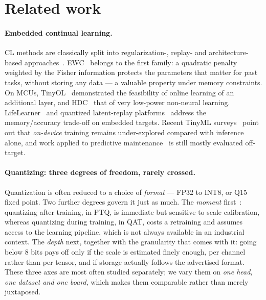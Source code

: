 \section{Related work}
\label{sec:related}

\paragraph{Embedded continual learning.} CL methods are classically split into regularization-, replay-
and architecture-based approaches~\cite{DeLange2021Survey}. EWC~\cite{Kirkpatrick2017EWC} belongs to the
first family: a quadratic penalty weighted by the Fisher information protects the parameters that matter
for past tasks, without storing any data --- a valuable property under memory constraints. On MCUs,
\gls{TinyOL}~\cite{Ren2021TinyOL} demonstrated the feasibility of online learning of an additional layer, and
\gls{HDC}~\cite{Benatti2019HDC} that of very low-power non-neural learning.
LifeLearner~\cite{Kwon2023LifeLearner} and quantized latent-replay
platforms~\cite{Ravaglia2021QLRCL} address the memory/accuracy trade-off on embedded targets. Recent
\gls{TinyML} surveys~\cite{Capogrosso2023TinyML} point out that \emph{on-device} training remains
under-explored compared with inference alone, and work applied to predictive
maintenance~\cite{Hurtado2023CLPdM} is still mostly evaluated off-target.

\paragraph{Quantizing: three degrees of freedom, rarely crossed.} Quantization is often reduced to a
choice of \emph{format} --- FP32 to INT8, or Q15 fixed point. Two further degrees govern it just as much.
The \emph{moment} first~\cite{Jacob2018,Krishnamoorthi2018}: quantizing after training, in PTQ, is immediate but sensitive to scale calibration,
whereas quantizing during training, in QAT, costs a retraining and assumes access to the learning pipeline,
which is not always available in an industrial context. The \emph{depth} next, together with the
granularity that comes with it: going below 8 bits pays off only if the scale is estimated finely enough,
per channel rather than per tensor, and if storage actually follows the advertised format. These three
axes are most often studied separately; we vary them on \emph{one head, one dataset and one board}, which
makes them comparable rather than merely juxtaposed.

